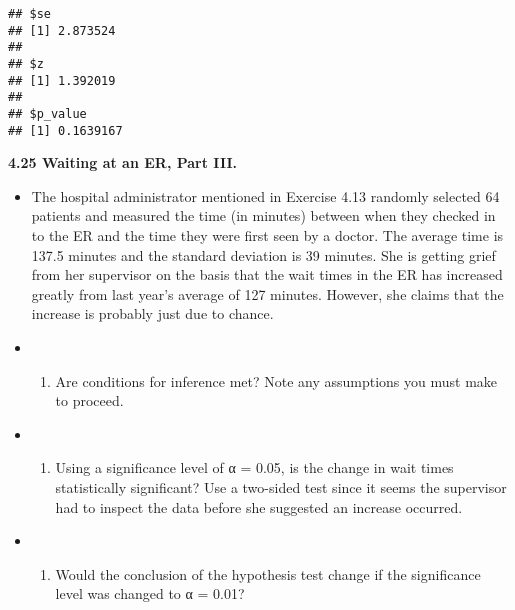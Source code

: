 \documentclass[]{book}
\newenvironment{Shaded}{\begin{snugshade}}{\end{snugshade}}
\newcommand{\CommentTok}[1]{\textcolor[rgb]{0.56,0.35,0.01}{\textit{#1}}}
\providecommand{\tightlist}{%
  \setlength{\itemsep}{0pt}\setlength{\parskip}{0pt}}
\begin{document}
\begin{verbatim}
## $se
## [1] 2.873524
## 
## $z
## [1] 1.392019
## 
## $p_value
## [1] 0.1639167
\end{verbatim}

\textbf{4.25 Waiting at an ER, Part III.}

\begin{itemize}
\item
  The hospital administrator mentioned in Exercise 4.13
  randomly selected 64 patients and measured the time (in minutes) between when they checked in
  to the ER and the time they were first seen by a doctor. The average time is 137.5 minutes and
  the standard deviation is 39 minutes. She is getting grief from her supervisor on the basis that
  the wait times in the ER has increased greatly from last year's average of 127 minutes. However,
  she claims that the increase is probably just due to chance.
\item
  \begin{enumerate}
  \def\labelenumi{(\alph{enumi})}
  \tightlist
  \item
    Are conditions for inference met? Note any assumptions you must make to proceed.
  \end{enumerate}
\item
  \begin{enumerate}
  \def\labelenumi{(\alph{enumi})}
  \setcounter{enumi}{1}
  \tightlist
  \item
    Using a significance level of α = 0.05, is the change in wait times statistically significant? Use
    a two-sided test since it seems the supervisor had to inspect the data before she suggested an
    increase occurred.
  \end{enumerate}
\item
  \begin{enumerate}
  \def\labelenumi{(\alph{enumi})}
  \setcounter{enumi}{2}
  \tightlist
  \item
    Would the conclusion of the hypothesis test change if the significance level was changed to
    α = 0.01?
  \end{enumerate}
\end{itemize}

\begin{Shaded}
\end{Shaded}
\end{document}
